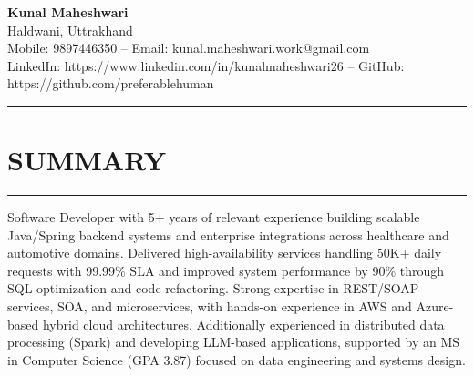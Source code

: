 \documentclass[11pt]{article}
\begin{document}
\textbf{\Large Kunal Maheshwari} \\ 
Haldwani, Uttrakhand \\
Mobile: 9897446350 --
Email: kunal.maheshwari.work@gmail.com \\
LinkedIn: https://www.linkedin.com/in/kunalmaheshwari26 --
GitHub: https://github.com/preferablehuman

\noindent\rule{\linewidth}{0.4pt}

\section*{SUMMARY}
\vspace{-1.2em}
\noindent\rule{\linewidth}{0.4pt}

Software Developer with 5+ years of relevant experience building scalable Java/Spring backend systems and enterprise integrations across healthcare and automotive domains. Delivered high-availability services handling 50K+ daily requests with 99.99\% SLA and improved system performance by 90\% through SQL optimization and code refactoring. Strong expertise in REST/SOAP services, SOA, and microservices, with hands-on experience in AWS and Azure-based hybrid cloud architectures. Additionally experienced in distributed data processing (Spark) and developing LLM-based applications, supported by an MS in Computer Science (GPA 3.87) focused on data engineering and systems design.
\end{document}
